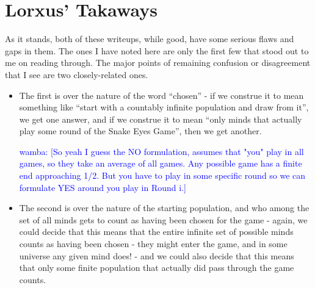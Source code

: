\documentclass[article,twocolumn]{memoir}
\newcommand{\wamba} [1]{\ifnum\Chatty=1 \textcolor{blue}{wamba:  [#1]} \fi}
\begin{document}
\chapter*{Lorxus' Takaways}
As it stands, both of these writeups, while good, have some serious flaws and gaps in them. The ones I have noted here are only the first few that stood out to me on reading through. The major points of remaining confusion or disagreement that I see are two closely-related ones. 
\begin{itemize}
    \item The first is over the nature of the word “chosen” - if we construe it to mean something like “start with a countably infinite population and draw from it”, we get one answer, and if we construe it to mean “only minds that actually play some round of the Snake Eyes Game”, then we get another. 

        \wamba{So yeah I guess the NO formulation, assumes that "you" play in all games, so they take an average of all games. Any possible game has a finite end approaching 1/2.  But you have to play in some specific round so we can formulate YES around you play in Round i.}
    \item The second is over the nature of the starting population, and who among the set of all minds gets to count as having been chosen for the game - again, we could decide that this means that the entire infinite set of possible minds counts as having been chosen - they might enter the game, and in some universe any given mind does! - and we could also decide that this means that only some finite population that actually did pass through the game counts.
\end{itemize}
\end{document}
